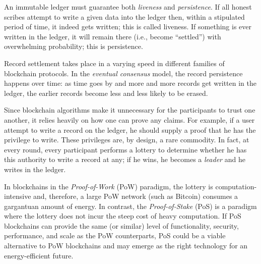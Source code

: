 An immutable ledger must guarantee both \emph{liveness} and \emph{persistence}.
If all honest scribes attempt to write a given data into the ledger then, within a stipulated period of time, 
it indeed gets written; this is called liveness. 
If something is ever written in the ledger, it will remain there (i.e., become ``settled'') with overwhelming probability; 
this is persistence. 

Record settlement takes place in a varying speed in 
different families of blockchain protocols.
In the \emph{eventual consensus} model, 
the record persistence happens over time: 
as time goes by and more and more records get written in the ledger, 
the earlier records become less and less likely to be erased. 


Since blockchain algorithms make it unnecessary 
for the participants to trust one another, 
it relies heavily on how one can prove any claims. 
For example, if a user attempt to write a record on the ledger, 
he should supply a proof that he has the privilege to write. 
These privileges are, by design, a rare commodity. 
In fact, 
at every round, 
every participant performs a lottery to determine 
whether he has this authority to write a record at any; 
if he wins, he becomes a \emph{leader} and he writes in the ledger. 


In blockchains in the \emph{Proof-of-Work} (PoW) paradigm, 
the lottery is computation-intensive and, 
therefore, a large PoW network (such as Bitcoin) consumes a gargantuan amount of energy.
In contrast, the \emph{Proof-of-Stake} (PoS) is a paradigm where 
the lottery does not incur the steep cost of heavy computation. 
If PoS blockchains can provide the same (or similar) level of 
functionality, security, performance, and scale as the PoW counterparts, 
PoS could be a viable alternative to PoW blockchains 
and may emerge as the right technology for an energy-efficient future.


